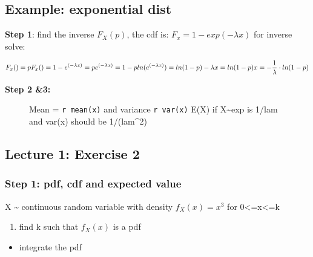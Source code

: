 \documentclass[
  letterpaper,
  DIV=11,
  numbers=noendperiod]{scrreprt}
\providecommand{\tightlist}{%
  \setlength{\itemsep}{0pt}\setlength{\parskip}{0pt}}\usepackage{longtable,booktabs,array}
\begin{document}
\subsection{Example: exponential dist}\label{example-exponential-dist}

\textbf{Step 1}: find the inverse \(F_X(p)\), the cdf is:
\(F_x = 1- exp(-\lambda x)\) for inverse solve:

\[
F_x() = p  \\
F_x() = 1- e^{(-\lambda x)} = p \\
e^{(-\lambda x)} = 1 - p \\
ln(e^{(-\lambda x)}) = ln(1-p) \\
-\lambda x = ln(1-p) \\
x = - \frac{1}{\lambda} \cdot ln(1-p)
\]

\textbf{Step 2 \&3:}

\begin{figure}


\caption{\label{fig-exp.ex}Mean = \texttt{r\ mean(x)} and variance
\texttt{r\ var(x)} E(X) if X\textasciitilde exp is 1/lam and var(x)
should be 1/(lam\^{}2)}

\end{figure}%

\subsection{Lecture 1: Exercise 2}\label{lecture-1-exercise-2}

\subsubsection{Step 1: pdf, cdf and expected
value}\label{step-1-pdf-cdf-and-expected-value}

X \textasciitilde{} continuous random variable with density
\(f_X(x) = x^3\) for 0\textless=x\textless=k

\begin{enumerate}
\def\labelenumi{\arabic{enumi}.}
\tightlist
\item
  find k such that \(f_X(x)\) is a pdf
\end{enumerate}

\begin{itemize}
\tightlist
\item
  integrate the pdf
\end{itemize}
\end{document}
